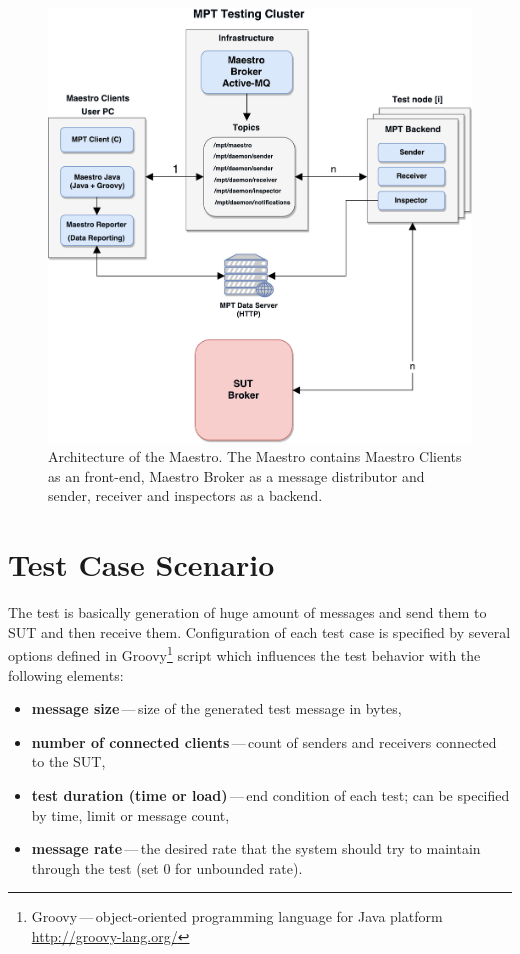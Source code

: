 \begin{figure}[H]
  \centering
  \includegraphics[width=15cm]{obrazky-figures/msg_perf_tool.pdf}
  \caption{Architecture of the Maestro. The Maestro contains Maestro Clients as an front-end, Maestro Broker as a message distributor and sender, receiver and inspectors as a backend.}
  \label{fig:msg_perf_tool}
\end{figure}

\newpage

\section{Test Case Scenario}
The test is basically generation of huge amount of messages and send them to SUT and then receive them. Configuration of each test case is specified by several options defined in Groovy\footnote{Groovy\,---\,object-oriented programming language for Java platform \url{http://groovy-lang.org/}} script which influences the test behavior with the following elements:

\begin{itemize}
	\setlength\itemsep{0em}
	\item \textbf{message size}\,---\,size of the generated test message in bytes,
	\item \textbf{number of connected clients}\,---\,count of senders and receivers connected to the SUT,
	\item \textbf{test duration (time or load)}\,---\,end condition of each test; can be specified by time, limit or message count,
	\item \textbf{message rate}\,---\,the desired rate that the system should try to maintain through the test (set 0 for unbounded rate).
\end{itemize}

